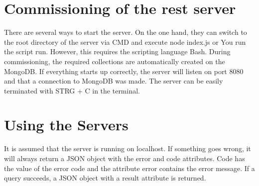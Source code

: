\documentclass[12pt]{scrartcl}
\begin{document}
    \section{Commissioning of the rest server}
        There are several ways to start the server.
        On the one hand, they can switch to the root directory of the server via CMD and execute node index.js or
        You run the script run. However, this requires the scripting language Bash.
        During commissioning, the required collections are automatically created on the MongoDB.
        If everything starts up correctly, the server will listen on port 8080
        and that a connection to MongoDB was made.
        The server can be easily terminated with STRG + C in the terminal.
    \section{Using the Servers}
        It is assumed that the server is running on localhost.
        If something goes wrong, it will always return a JSON object with the error and code attributes.
        Code has the value of the error code and the attribute error contains the error message.
        If a query succeeds, a JSON object with a result attribute is returned.
\end{document}
